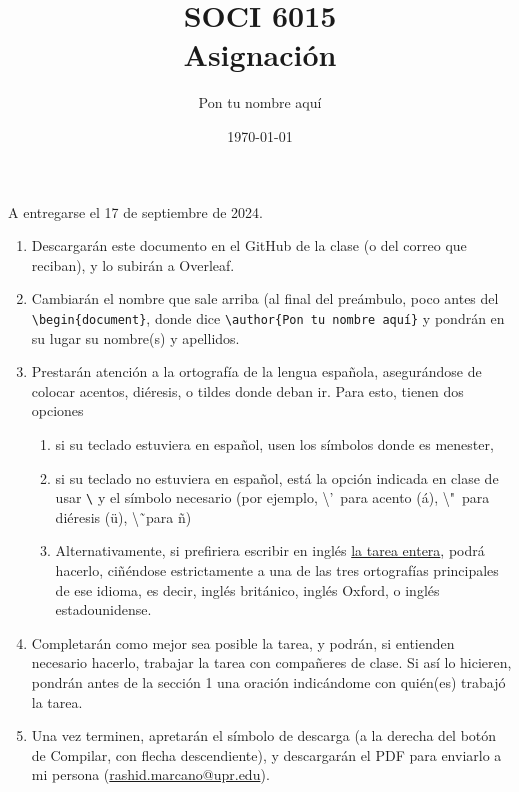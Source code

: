 \documentclass[11pt]{article}
\title{SOCI 6015\\ Asignación \textnumero 3}
\author{Pon tu nombre aquí}
\date{\today}
\begin{document}
\maketitle
\vspace{-1cm}
\begin{center}
   A entregarse el 17 de septiembre de 2024. 
\end{center}

\begin{enumerate}
    \item Descargarán este documento en el GitHub de la clase (o del correo que reciban), y lo subirán a Overleaf.
    \item Cambiarán el nombre que sale arriba (al final del preámbulo, poco antes del \texttt{\textbackslash begin\{document\}}, donde dice \texttt{\textbackslash author\{Pon tu nombre aquí\}} y pondrán en su lugar su nombre(s) y apellidos.
    \item Prestarán atención a la ortografía de la lengua española, asegurándose de colocar acentos, diéresis, o tildes donde deban ir. Para esto, tienen dos opciones 
    \begin{enumerate}
         \item si su teclado estuviera en español, usen los símbolos donde es menester,
        \item si su teclado no estuviera en español, está la opción indicada en clase de usar \texttt{\textbackslash} y el símbolo necesario (por ejemplo, \textbackslash'\ para acento (\'a), \textbackslash "\  para diéresis (\"u), \textbackslash \~\ para \~n)
        \item Alternativamente, si prefiriera escribir en inglés \underline{la tarea entera}, podrá hacerlo, ciñéndose estrictamente a una de las tres ortografías principales de ese idioma, es decir, inglés británico, inglés Oxford, o inglés estadounidense.
    \end{enumerate}
    \item Completarán como mejor sea posible la tarea, y podrán, si entienden necesario hacerlo, trabajar la tarea con compañeres de clase. Si así lo hicieren, pondrán antes de la sección 1 una oración indicándome con quién(es) trabajó la tarea. %
    \item  Una vez terminen, apretarán el símbolo de descarga (a la derecha del botón de Compilar, con flecha descendiente), y descargarán el PDF para enviarlo a mi persona (\href{mailto:rashid.marcano@upr.edu}{rashid.marcano@upr.edu}).

\end{enumerate}
\end{document}
